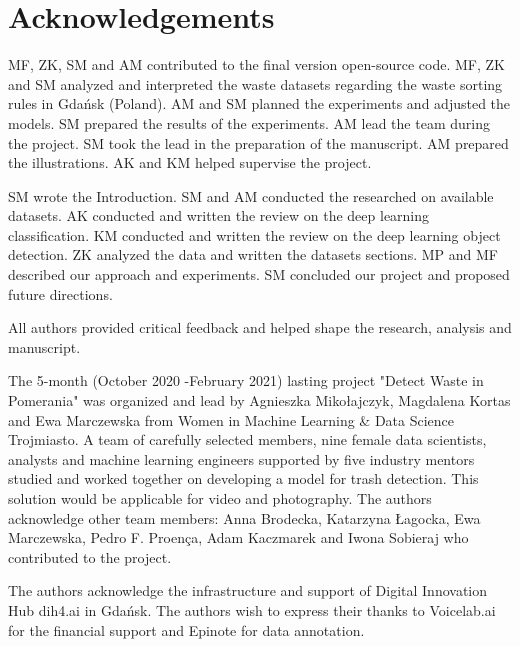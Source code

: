 \documentclass{article}
\begin{document}
\section{Acknowledgements}

MF, ZK, SM and AM contributed to the final version open-source code. MF, ZK and SM analyzed and interpreted the waste datasets regarding the waste sorting rules in Gdańsk (Poland). AM and SM planned the experiments and adjusted the models. SM prepared the results of the experiments. AM lead the team during the project. SM took the lead in the preparation of the manuscript. AM prepared the illustrations. AK and KM helped supervise the project.

SM wrote the Introduction. SM and AM conducted the researched on available datasets. AK conducted and written the review on the deep learning classification. KM conducted and written the review on the deep learning object detection. ZK analyzed the data and written the datasets sections. MP and MF described our approach and experiments. SM concluded our project and proposed future directions.

All authors provided critical feedback and helped shape the research, analysis and manuscript.

The 5-month (October 2020 -February 2021) lasting project "Detect Waste in Pomerania" was organized and lead by Agnieszka Mikołajczyk, Magdalena Kortas and Ewa Marczewska from Women in Machine Learning \& Data Science Trojmiasto. A team of carefully selected members, nine female data scientists, analysts and machine learning engineers supported by five industry mentors studied and worked together on developing a model for trash detection. This solution would be applicable for video and photography. The authors acknowledge other team members: Anna Brodecka, Katarzyna Łagocka, Ewa Marczewska, Pedro F. Proença, Adam Kaczmarek and Iwona Sobieraj who contributed to the project.

The authors acknowledge the infrastructure and support of Digital Innovation Hub dih4.ai in Gdańsk. The authors wish to express their thanks to Voicelab.ai for the financial support and Epinote for data annotation.

\medskip


\end{document}
